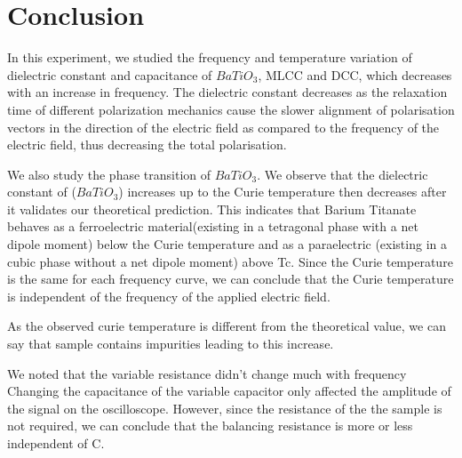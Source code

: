 \section{Conclusion}
	In this experiment, we studied the frequency and temperature variation of dielectric constant and capacitance of $BaTiO_3$, MLCC and DCC, which decreases with an increase in frequency. The dielectric constant decreases as the relaxation time of different polarization mechanics cause the slower alignment of polarisation vectors in the direction of the electric field as compared to the frequency of the electric field, thus decreasing the total polarisation.
	
	We also study the phase transition of $BaTiO_3$. We observe that  the dielectric constant of ($BaTiO_3$) increases up to the Curie temperature then decreases after it validates our theoretical prediction. This indicates that Barium Titanate behaves as a ferroelectric material(existing in a tetragonal phase with a net dipole moment) below the Curie temperature and as a paraelectric (existing in a cubic phase without a net dipole moment) above Tc. Since the Curie temperature is the same for each frequency curve, we can conclude that the Curie temperature is independent of the frequency of the applied electric field.
	
	As the observed curie temperature is different from the theoretical value, we can say that sample contains impurities leading to this increase.
	
	We noted that the variable resistance didn't change much with frequency  Changing the capacitance of the variable capacitor only affected the amplitude of the signal on the oscilloscope. However, since the resistance of the the sample is not required, we can conclude that the balancing resistance is more or less independent of C.
 